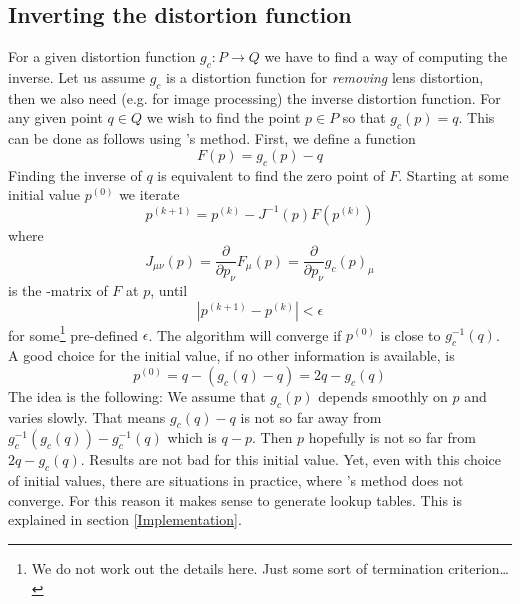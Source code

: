 \documentclass[10pt,a4paper]{article}
\newcommand{\norm}[1]{\left|#1\right|}
\begin{document}
\subsection{Inverting the distortion function}
\label{InvertingTheModel}
For a given distortion function $g_c:P\rightarrow Q$ we have to find a way of computing the inverse.
Let us assume $g_c$ is a distortion function for {\em removing} lens distortion, then we also need
(e.g. for image processing) the inverse distortion function. For any given point $q\in Q$
we wish to find the point $p\in P$ so that $g_c(p) = q$. This can be done as follows
using \Newton's method. First, we define a function
\begin{equation}
F(p) = g_c(p) - q
\end{equation}
Finding the inverse of $q$ is equivalent to find the zero point of $F$.
Starting at some initial value $p^{(0)}$ we iterate
\begin{equation}
p^{(k+1)} = p^{(k)} - J^{-1}(p) F(p^{(k)})
\end{equation}
where
\begin{equation}
J_{\mu\nu}(p) = \frac \partial {\partial p_\nu} F_\mu(p) = \frac \partial {\partial p_\nu} g_c(p)_\mu
\end{equation}
is the \Jacobi-matrix of $F$ at $p$,
until
\begin{equation}
\norm{p^{(k+1)} - p^{(k)}} < \epsilon
\end{equation}
for some\footnote{We do not work out the details here. Just some sort of termination criterion\ldots} pre-defined $\epsilon$.
The algorithm will converge if $p^{(0)}$ is close to $g_c^{-1}(q)$.
A good choice for the initial value, if no other information is available, is
\begin{equation}
p^{(0)} = q - (g_c(q) - q) = 2q - g_c(q)
\end{equation}
The idea is the following: We assume that $g_c(p)$ depends smoothly on $p$ and varies slowly.
That means $g_c(q) - q$ is not so far away from $g_c^{-1}(g_c(q)) - g_c^{-1}(q)$ which is $q - p$.
Then $p$ hopefully is not so far from $2q - g_c(q)$. Results are not bad for this initial value.
Yet, even with this choice of initial values, there are situations in practice, where
\Newton's method does not converge. For this reason it makes sense to generate lookup tables.
This is explained in section \ref{Implementation}.
\end{document}
